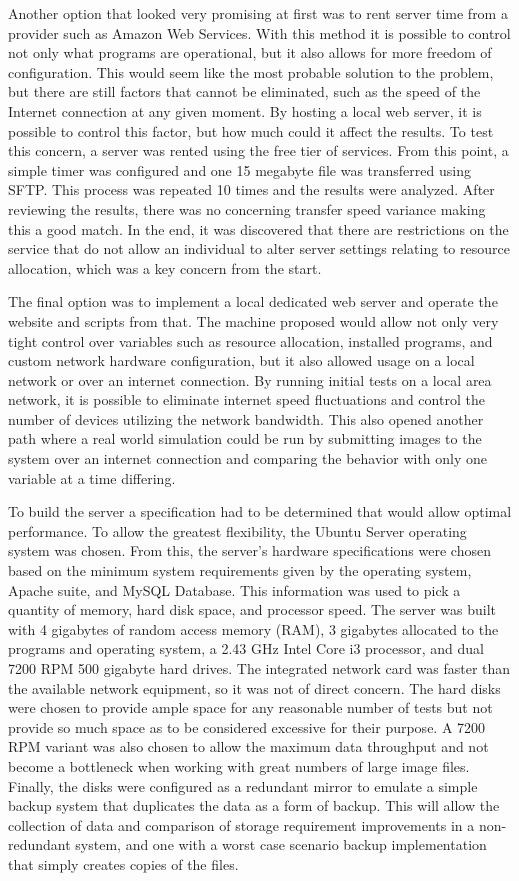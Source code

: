 Another option that looked very promising at first was to rent server time from a provider such as Amazon Web Services. With this method it is possible to control not only what programs are operational, but it also allows for more freedom of configuration. This would seem like the most probable solution to the problem, but there are still factors that cannot be eliminated, such as the speed of the Internet connection at any given moment. By hosting a local web server, it is possible to control this factor, but how much could it affect the results. To test this concern, a server was rented using the free tier of services. From this point, a simple timer was configured and one 15 megabyte file was transferred using SFTP. This process was repeated 10 times and the results were analyzed. After reviewing the results, there was no concerning transfer speed variance making this a good match. In the end, it was discovered that there are restrictions on the service that do not allow an individual to alter server settings relating to resource allocation, which was a key concern from the start.

The final option was to implement a local dedicated web server and operate the website and scripts from that. The machine proposed would allow not only very tight control over variables such as resource allocation, installed programs, and custom network hardware configuration, but it also allowed usage on a local network or over an internet connection. By running initial tests on a local area network, it is possible to eliminate internet speed fluctuations and control the number of devices utilizing the network bandwidth. This also opened another path where a real world simulation could be run by submitting images to the system over an internet connection and comparing the behavior with only one variable at a time differing.

To build the server a specification had to be determined that would allow optimal performance. To allow the greatest flexibility, the Ubuntu Server operating system was chosen. From this, the server's hardware specifications were chosen based on the minimum system requirements given by the operating system, Apache suite, and MySQL Database. This information was used to pick a quantity of memory, hard disk space, and processor speed. The server was built with 4 gigabytes of random access memory (RAM), 3 gigabytes allocated to the programs and operating system, a 2.43 GHz Intel Core i3 processor, and dual 7200 RPM 500 gigabyte hard drives. The integrated network card was faster than the available network equipment, so it was not of direct concern. The hard disks were chosen to provide ample space for any reasonable number of tests but not provide so much space as to be considered excessive for their purpose. A 7200 RPM variant was also chosen to allow the maximum data throughput and not become a bottleneck when working with great numbers of large image files. Finally, the disks were configured as a redundant mirror to emulate a simple backup system that duplicates the data as a form of backup. This will allow the collection of data and comparison of storage requirement improvements in a non-redundant system, and one with a worst case scenario backup implementation that simply creates copies of the files.

